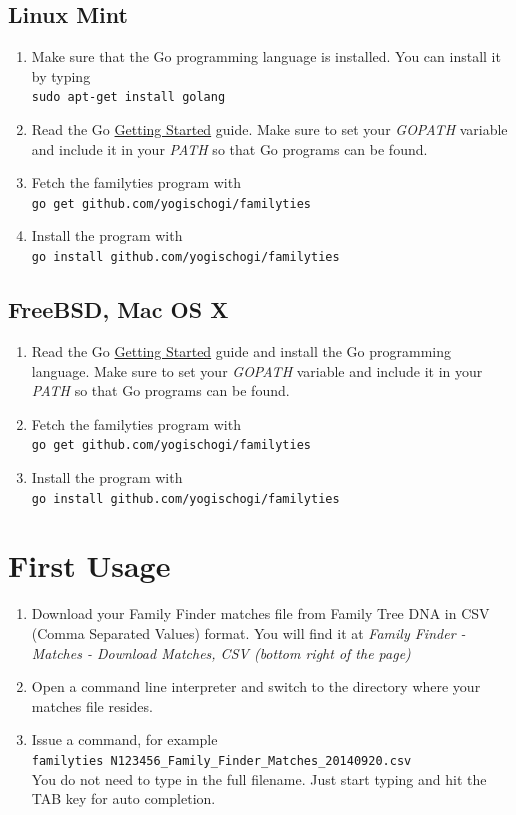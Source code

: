 \documentclass[12pt,a4paper]{article}
\begin{document}
\subsection{Linux Mint}
\begin{enumerate}
\item Make sure that the Go programming language is installed.
	You can install it by typing\\
	\texttt{sudo apt-get install golang}
\item Read the Go
	\href{http://golang.org/doc/install}{Getting Started}
	guide. Make sure to set your \emph{GOPATH} variable and
	include it in your \emph{PATH} so that Go programs can be
	found.
\item Fetch the familyties program with\\
	\texttt{go get github.com/yogischogi/familyties}
\item Install the program with\\
	 \texttt{go install github.com/yogischogi/familyties}
\end{enumerate}

\subsection{FreeBSD, Mac OS X}
\begin{enumerate}
\item Read the Go
	\href{http://golang.org/doc/install}{Getting Started}
	guide and install the Go programming language. 
    Make sure to set your \emph{GOPATH} variable and
	include it in your \emph{PATH} so that Go programs can be
	found.
\item Fetch the familyties program with\\
	\texttt{go get github.com/yogischogi/familyties}
\item Install the program with\\
	 \texttt{go install github.com/yogischogi/familyties}
\end{enumerate}


\section{First Usage}

\begin{enumerate}
\item Download your Family Finder matches file from Family Tree DNA
   in CSV (Comma Separated Values) format. You will find it at
   \emph{Family Finder - Matches - Download Matches, CSV
   (bottom right of the page)}
\item Open a command line interpreter and switch to the
   directory where your matches file resides.
\item Issue a command, for example\\
  \texttt{familyties N123456\_Family\_Finder\_Matches\_20140920.csv}\\
  You do not need to type in the full filename. Just start typing and
  hit the TAB key for auto completion.
\end{enumerate}
\end{document}
